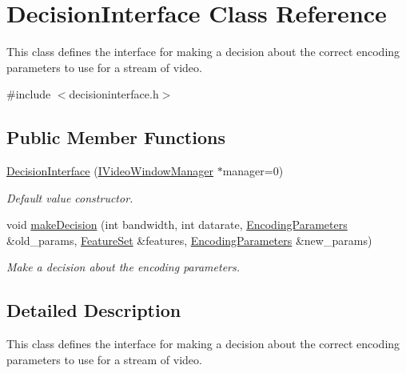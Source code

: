 \hypertarget{classDecisionInterface}{\section{Decision\-Interface Class Reference}
\label{classDecisionInterface}
}


This class defines the interface for making a decision about the correct encoding parameters to use for a stream of video.  




{\ttfamily \#include $<$decisioninterface.\-h$>$}

\subsection*{Public Member Functions}
\begin{DoxyCompactItemize}
\item 
\hyperlink{classDecisionInterface_ae6805979ca909974aa06e40ff0c5d12f}{Decision\-Interface} (\hyperlink{classIVideoWindowManager}{I\-Video\-Window\-Manager} $\ast$manager=0)
\begin{DoxyCompactList}\small\item\em Default value constructor. \end{DoxyCompactList}\item 
void \hyperlink{classDecisionInterface_afd67dc2e1710da83987ad842d6b0a69a}{make\-Decision} (int bandwidth, int datarate, \hyperlink{classEncodingParameters}{Encoding\-Parameters} \&old\-\_\-params, \hyperlink{classFeatureSet}{Feature\-Set} \&features, \hyperlink{classEncodingParameters}{Encoding\-Parameters} \&new\-\_\-params)
\begin{DoxyCompactList}\small\item\em Make a decision about the encoding parameters. \end{DoxyCompactList}\end{DoxyCompactItemize}


\subsection{Detailed Description}
This class defines the interface for making a decision about the correct encoding parameters to use for a stream of video. 

